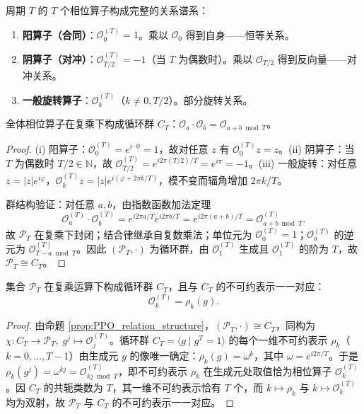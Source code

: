 \begin{proposition}[相位算子的关系结构]\label{prop:PPO_relation_structure}
周期 $T$ 的 $T$ 个相位算子构成完整的关系谱系：
\begin{enumerate}[label=(\roman*)]
    \item \textbf{阳算子（合同）}：$\mathcal{O}_0^{(T)} = 1$。乘以 $\mathcal{O}_0$ 得到自身——恒等关系。
    \item \textbf{阴算子（对冲）}：$\mathcal{O}_{T/2}^{(T)} = -1$（当 $T$ 为偶数时）。乘以 $\mathcal{O}_{T/2}$ 得到反向量——对冲关系。
    \item \textbf{一般旋转算子}：$\mathcal{O}_k^{(T)}$（$k \neq 0, T/2$）。部分旋转关系。
\end{enumerate}
全体相位算子在复乘下构成循环群 $C_T$：$\mathcal{O}_a \cdot \mathcal{O}_b = \mathcal{O}_{a+b \bmod T}$。
\end{proposition}

\begin{proof}
(i) 阳算子：$\mathcal{O}_0^{(T)} = e^{i\cdot 0} = 1$，故对任意 $z$ 有 $\mathcal{O}_0^{(T)} z = z$。(ii) 阴算子：当 $T$ 为偶数时 $T/2 \in \mathbb{N}$，故 $\mathcal{O}_{T/2}^{(T)} = e^{i2\pi(T/2)/T} = e^{i\pi} = -1$。(iii) 一般旋转：对任意 $z = |z|e^{i\varphi}$，$\mathcal{O}_k^{(T)} z = |z| e^{i(\varphi + 2\pi k/T)}$，模不变而辐角增加 $2\pi k/T$。

群结构验证：对任意 $a,b$，由指数函数加法定理
\[
\mathcal{O}_a^{(T)} \cdot \mathcal{O}_b^{(T)} = e^{i2\pi a/T} e^{i2\pi b/T} = e^{i2\pi(a+b)/T} = \mathcal{O}_{a+b \bmod T}^{(T)}.
\]
故 $\mathcal{P}_T$ 在复乘下封闭；结合律继承自复数乘法；单位元为 $\mathcal{O}_0^{(T)} = 1$；$\mathcal{O}_a^{(T)}$ 的逆元为 $\mathcal{O}_{T-a \bmod T}^{(T)}$。因此 $(\mathcal{P}_T, \cdot)$ 为循环群，由 $\mathcal{O}_1^{(T)}$ 生成且 $\mathcal{O}_1^{(T)}$ 的阶为 $T$，故 $\mathcal{P}_T \cong C_T$。
\end{proof}

\begin{proposition}[相位算子与不可约表示的对应]\label{prop:PPO_group_yijing}
集合 $\mathcal{P}_T$ 在复乘运算下构成循环群 $C_T$，且与 $C_T$ 的不可约表示一一对应：
\[
\mathcal{O}_k^{(T)} = \rho_k(g).
\]
\end{proposition}

\begin{proof}
由命题 \ref{prop:PPO_relation_structure}，$(\mathcal{P}_T, \cdot) \cong C_T$，同构为 $\chi: C_T \to \mathcal{P}_T,\; g^j \mapsto \mathcal{O}_j^{(T)}$。循环群 $C_T = \langle g \mid g^T = 1 \rangle$ 的每个一维不可约表示 $\rho_k$（$k = 0,\dots,T-1$）由生成元 $g$ 的像唯一确定：$\rho_k(g) = \omega^k$，其中 $\omega = e^{i2\pi/T}$。于是 $\rho_k(g^j) = \omega^{kj} = \mathcal{O}_{kj \bmod T}^{(T)}$，即不可约表示 $\rho_k$ 在生成元处取值恰为相位算子 $\mathcal{O}_k^{(T)}$。因 $C_T$ 的共轭类数为 $T$，其一维不可约表示恰有 $T$ 个，而 $k \mapsto \rho_k$ 与 $k \mapsto \mathcal{O}_k^{(T)}$ 均为双射，故 $\mathcal{P}_T$ 与 $C_T$ 的不可约表示一一对应。
\end{proof}


